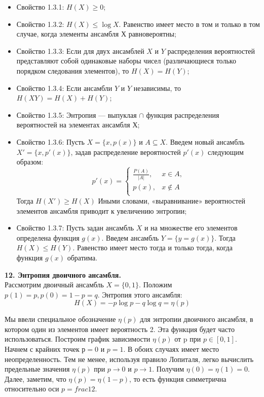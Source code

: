 \documentclass[14pt]{article}
\begin{document}
\begin{itemize}
    \item Свойство 1.3.1: \( H(X) \geq 0\);
    \item Свойство 1.3.2: \( H(X) \leq \log X\). Равенство имеет место в том и только в том случае, когда элементы ансамбля Х равновероятны;
    \item Свойство 1.3.3: Если для двух ансамблей \(X\) и \(Y\) распределения вероятностей представляют собой одинаковые наборы чисел (различающиеся только порядком следования элементов), то \( H(X) = H(Y)\);
    \item Свойство 1.3.4: Если ансамбли \(Y\) и \(Y\) независимы, то \(H(XY) = H(X) + H(Y)\);
    \item Свойство 1.3.5: Энтропия — выпуклая \( \cap \) функция распределения вероятностей на элементах ансамбля \(Х\);
    \item Свойство 1.3.6: Пусть \(X = \{x, p(x)\}\) и \( A \subseteq X\). Введем новый ансамбль \(X' = \{x, p'(x)\}\), задав распределение вероятностей \( p'(x) \) следующим образом: \\
    \begin{displaymath}
    p'(x) = \left\{ \begin{array}{ll}
        \frac{P(A)}{|A|}, & \textrm{\(x \in A\),}\\
        p(x), & \textrm{\(x \notin A\)}\\
    \end{array} \right.
    \end{displaymath}
        Тогда \( H(X') \geq H(X) \) Иными словами, «выравнивание» вероятностей элементов ансамбля приводит к увеличению энтропии;
    \item Свойство 1.3.7: Пусть задан ансамбль \( X \) и на множестве его элементов определена функция  \(g(x)\). Введем ансамбль \( Y = \{y = g(x)\} \). Тогда \( H(X) \leq H(Y)\). Равенство имеет место тогда и только тогда, когда функция \(g(x)\) обратима. 
\end{itemize}

\bigskip
\textbf{12. Энтропия двоичного ансамбля.} \\

Рассмотрим двоичный ансамбль \(X = \{0,1\}\). Положим \(p(1) = p, p(0) = 1 - p = q\). Энтропия этого ансамбля: \\
\begin{displaymath}
    H(X) = -p\log p - q \log q = \eta(p)
\end{displaymath}

Мы ввели специальное обозначение \( \eta(p) \) для энтропии двоичного ансамбля, в котором один из элементов имеет вероятность 2. Эта функция будет часто использоваться. Построим график зависимости \( \eta(p) \) от p при \( p \in [0,1]\). Начнем с крайних точек \(р = 0\) и \(p = 1\). В обоих случаях имеет место неопределенность. Тем не менее, используя правило Лопиталя, легко вычислить предельные значения \(\eta(p)\) при \( p \to 0\) и \( p \to 1\). Получим \(\eta(0) = \eta(1) = 0\). Далее, заметим, что \(\eta(p) = \eta(1 - p)\), то есть функция симметрична относительно оси \( p = frac{1}{2} \). \\
\end{document}
